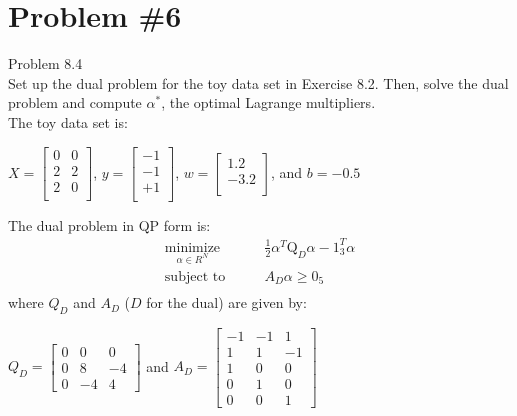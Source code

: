 \documentclass[12pt]{article}
\begin{document}
	\section*{Problem \#6}
	Problem 8.4 \\
	Set up the dual problem for the toy data set in Exercise 8.2. Then, solve the dual problem and compute $\alpha^*$, the optimal Lagrange
	multipliers. \\
	The toy data set is:
	\begin{center}
		$X = \left[
		\begin{array}{cc}
		0 & 0 \\
		2 &2 \\
		2 & 0 \\
		\end{array}
		\right]$, $y = \left[ 
		\begin{array}{c}
		-1\\
		-1\\
		+1\\
		\end{array} \right]$,
		$w = \left[ 
		\begin{array}{c}
		1.2\\
		-3.2\\
		\end{array} \right]$, and 
		$b=-0.5$
	\end{center}
	The dual problem in QP form is:
		\begin{align*}
		\underset{\alpha \in R^{N}}{\text{minimize}} &\qquad \frac{1}{2}\alpha^T\text{Q}_D\alpha-1_{3}^{T}\alpha \\
		\text{subject to} & \qquad A_D\alpha \ge 0_{5} \\
		\end{align*}
		where $Q_D$ and $A_D$ ($D$ for the dual) are given by:\\
		\begin{center}
			$Q_D = \left[
			\begin{array}{ccc}
			0 & 0 & 0\\
			0 & 8 & -4\\
			0 & -4 & 4
			\end{array}
			\right]$ 
			and 
			$A_D = \left[ 
			\begin{array}{ccc}
			-1 & -1 & 1\\
			1 & 1 & -1\\
			1 & 0 & 0\\
			0 & 1 & 0\\
			0 & 0 & 1
			\end{array} \right]$
		\end{center}
\end{document}
